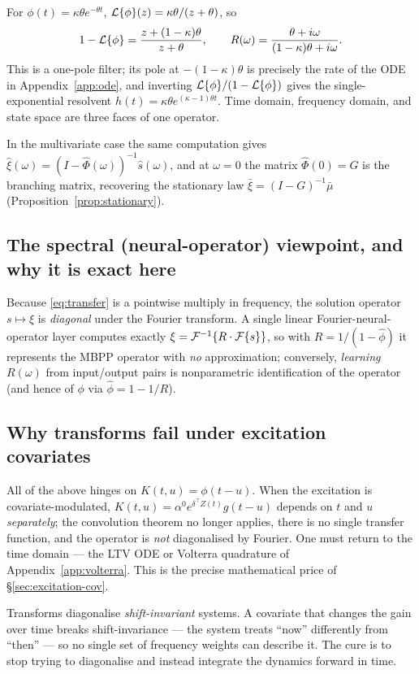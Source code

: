 \begin{example}
For $\phi(t)=\kappa\theta e^{-\theta t}$, $\mathcal{L}\{\phi\}(z)=\kappa\theta/(z+\theta)$,
so
\begin{equation*}
1-\mathcal{L}\{\phi\}=\frac{z+(1-\kappa)\theta}{z+\theta},\qquad
R(\omega)=\frac{\theta+i\omega}{(1-\kappa)\theta+i\omega}.
\end{equation*}
This is a one-pole filter; its pole at $-(1-\kappa)\theta$ is precisely the rate of
the ODE in Appendix~\ref{app:ode}, and inverting $\mathcal{L}\{\phi\}/(1-\mathcal{L}\{\phi\})$
gives the single-exponential resolvent $h(t)=\kappa\theta e^{(\kappa-1)\theta t}$.
Time domain, frequency domain, and state space are three faces of one operator.
\end{example}

In the multivariate case the same computation gives
$\hat\xi(\omega)=(I-\hat\Phi(\omega))^{-1}\hat s(\omega)$, and at $\omega=0$ the
matrix $\hat\Phi(0)=G$ is the branching matrix, recovering the stationary law
$\bar\xi=(I-G)^{-1}\bar\mu$ (Proposition~\ref{prop:stationary}).

\subsection{The spectral (neural-operator) viewpoint, and why it is exact here}

Because \eqref{eq:transfer} is a pointwise multiply in frequency, the solution
operator $s\mapsto\xi$ is \emph{diagonal} under the Fourier transform. A single
linear Fourier-neural-operator layer computes exactly
$\xi=\mathcal{F}^{-1}\{R\cdot\mathcal{F}\{s\}\}$, so with $R=1/(1-\hat\phi)$ it represents the
MBPP operator with \emph{no} approximation; conversely, \emph{learning} $R(\omega)$
from input/output pairs is nonparametric identification of the operator (and hence
of $\phi$ via $\hat\phi=1-1/R$).

\subsection{Why transforms fail under excitation covariates}

All of the above hinges on $K(t,u)=\phi(t-u)$. When the excitation is
covariate-modulated, $K(t,u)=\alpha^0 e^{\delta^\top Z(t)}g(t-u)$ depends on $t$
and $u$ \emph{separately}; the convolution theorem no longer applies, there is no
single transfer function, and the operator is \emph{not} diagonalised by Fourier.
One must return to the time domain --- the LTV ODE or Volterra quadrature of
Appendix~\ref{app:volterra}. This is the precise mathematical price of
\S\ref{sec:excitation-cov}.

\begin{intuition}
Transforms diagonalise \emph{shift-invariant} systems. A covariate that changes the
gain over time breaks shift-invariance --- the system treats ``now'' differently
from ``then'' --- so no single set of frequency weights can describe it. The cure is
to stop trying to diagonalise and instead integrate the dynamics forward in time.
\end{intuition}
